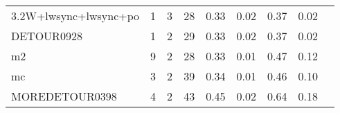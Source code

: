{\begin{tabular}{l|r|r|r|r|r|r|r|l}
3.2W+lwsync+lwsync+po                       & 1                                                                                                 & 3                                                                                                & 28                                                                                                                   & 0.33                            & 0.02                    & {\color[HTML]{00009B} 0.37}    & 0.02                       \\
DETOUR0928                                  & 1                                                                                                 & 2                                                                                                & 29                                                                                                                   & 0.33                            & 0.02                    & {\color[HTML]{00009B} 0.37}    & 0.02                       \\
m2                                          & 9                                                                                                 & 2                                                                                                & 28                                                                                                                   & 0.33                            & 0.01                    & {\color[HTML]{00009B} 0.47}    & 0.12                       \\
mc                                          & 3                                                                                                 & 2                                                                                                & 39                                                                                                                   & 0.34                            & 0.01                    & {\color[HTML]{00009B} 0.46}    & 0.10                       \\
MOREDETOUR0398                              & 4                                                                                                 & 2                                                                                                & 43                                                                                                                   & 0.45                            & 0.02                    & {\color[HTML]{00009B} 0.64}    & 0.18                       \\

\end{tabular}}
